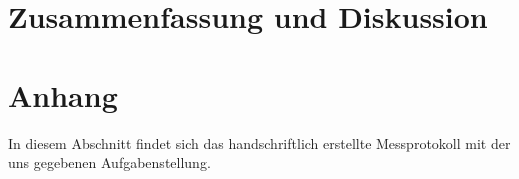 \section{Zusammenfassung und Diskussion}

\newpage
\section{Anhang}
In diesem Abschnitt findet sich das handschriftlich erstellte Messprotokoll mit der uns gegebenen Aufgabenstellung.\\
\begin{figure}[htbp]

\end{figure}
